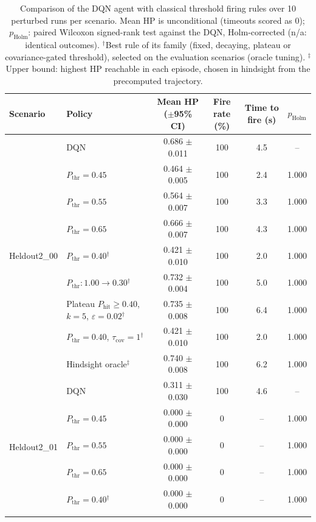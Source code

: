 \begin{table}[htbp]
\centering
\caption{Comparison of the DQN agent with classical threshold firing rules over 10 perturbed runs per scenario. Mean HP is unconditional (timeouts scored as 0); $p_{\mathrm{Holm}}$: paired Wilcoxon signed-rank test against the DQN, Holm-corrected (n/a: identical outcomes). $^{\dagger}$Best rule of its family (fixed, decaying, plateau or covariance-gated threshold), selected on the evaluation scenarios (oracle tuning). $^{\ddagger}$Upper bound: highest HP reachable in each episode, chosen in hindsight from the precomputed trajectory.}
\label{tab:comparison-traditional-rl}
\small
\begin{tabular}{llcccc}
\toprule
\textbf{Scenario} & \textbf{Policy} & \textbf{Mean HP ($\pm$95\% CI)} & \textbf{Fire rate (\%)} & \textbf{Time to fire (s)} & $p_{\mathrm{Holm}}$ \\
\midrule
\multirow{9}{*}{Heldout2\_00} & DQN & 0.686 $\pm$ 0.011 & 100 & 4.5 & -- \\
 & $P_{\mathrm{thr}}=0.45$ & 0.464 $\pm$ 0.005 & 100 & 2.4 & 1.000 \\
 & $P_{\mathrm{thr}}=0.55$ & 0.564 $\pm$ 0.007 & 100 & 3.3 & 1.000 \\
 & $P_{\mathrm{thr}}=0.65$ & 0.666 $\pm$ 0.007 & 100 & 4.3 & 1.000 \\
 & $P_{\mathrm{thr}}=0.40$$^{\dagger}$ & 0.421 $\pm$ 0.010 & 100 & 2.0 & 1.000 \\
 & $P_{\mathrm{thr}}: 1.00 \to 0.30$$^{\dagger}$ & 0.732 $\pm$ 0.004 & 100 & 5.0 & 1.000 \\
 & Plateau $P_{\mathrm{hit}}\geq0.40$, $k=5$, $\varepsilon=0.02$$^{\dagger}$ & 0.735 $\pm$ 0.008 & 100 & 6.4 & 1.000 \\
 & $P_{\mathrm{thr}}=0.40$, $\tau_{\mathrm{cov}}=1$$^{\dagger}$ & 0.421 $\pm$ 0.010 & 100 & 2.0 & 1.000 \\
 & Hindsight oracle$^{\ddagger}$ & 0.740 $\pm$ 0.008 & 100 & 6.2 & 1.000 \\
\midrule
\multirow{9}{*}{Heldout2\_01} & DQN & 0.311 $\pm$ 0.030 & 100 & 4.6 & -- \\
 & $P_{\mathrm{thr}}=0.45$ & 0.000 $\pm$ 0.000 & 0 & -- & 1.000 \\
 & $P_{\mathrm{thr}}=0.55$ & 0.000 $\pm$ 0.000 & 0 & -- & 1.000 \\
 & $P_{\mathrm{thr}}=0.65$ & 0.000 $\pm$ 0.000 & 0 & -- & 1.000 \\
 & $P_{\mathrm{thr}}=0.40$$^{\dagger}$ & 0.000 $\pm$ 0.000 & 0 & -- & 1.000 \\
$$
\end{tabular}
\end{table}
